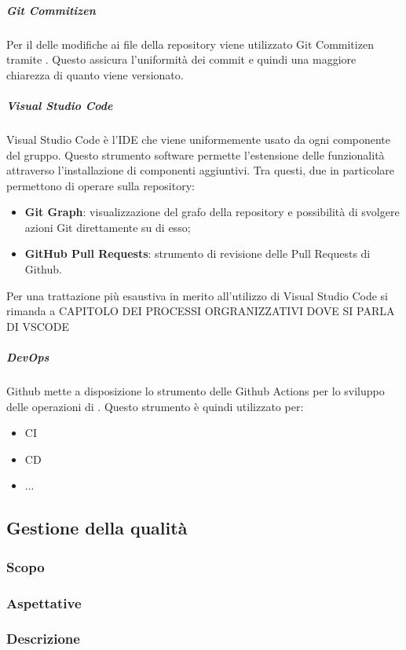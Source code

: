 \documentclass[../norme-di-progetto.tex]{subfiles}
\begin{document}
\subparagraph*{Git Commitizen}
Per il  delle modifiche ai file della repository viene utilizzato Git Commitizen tramite . Questo assicura l'uniformità dei commit e quindi una maggiore chiarezza di quanto viene versionato.

\subparagraph*{Visual Studio Code}
Visual Studio Code è l'IDE che viene uniformemente usato da ogni componente del gruppo. Questo strumento software permette l'estensione delle funzionalità attraverso l'installazione di componenti aggiuntivi. Tra questi, due in particolare permettono di operare sulla repository:
\begin{itemize}
  \item \textbf{Git Graph}: visualizzazione del grafo della repository e possibilità di svolgere azioni Git direttamente su di esso;
  \item \textbf{GitHub Pull Requests}: strumento di revisione delle Pull Requests di Github.
\end{itemize}
Per una trattazione più esaustiva in merito all'utilizzo di Visual Studio Code si rimanda a CAPITOLO DEI PROCESSI ORGRANIZZATIVI DOVE SI PARLA DI VSCODE

\subparagraph{DevOps}
Github mette a disposizione lo strumento delle Github Actions per lo sviluppo delle operazioni di . Questo strumento è quindi utilizzato per:
\begin{itemize}
  \item CI
  \item CD
  \item ...
\end{itemize}

\subsection{Gestione della qualità}
\subsubsection{Scopo}
\subsubsection{Aspettative}
\subsubsection{Descrizione}
\end{document}
